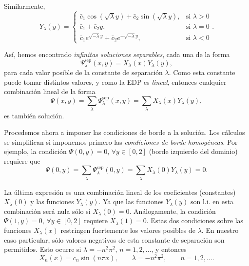 Similarmente,
\begin{equation}
    Y_\lambda(y)= 	\begin{cases}
        \bar{c}_1\cos(\sqrt{\lambda}y) + \bar{c}_2\sin(\sqrt{\lambda}y), & \text{si }\lambda>0  \\
        \bar{c}_1 + \bar{c}_2y,                                          & \text{si } \lambda=0 \\
        \bar{c}_1e^{\sqrt{-\lambda}y} + \bar{c}_2e^{-\sqrt{-\lambda}y},  & \text{si } \lambda<0
    \end{cases}.
\end{equation}

Así, hemos encontrado \textit{infinitas soluciones separables}, cada una de la forma
\begin{equation}\label{EjLapPsiXY}
    \Psi_\lambda^\text{sep}(x,y)=X_\lambda(x)Y_\lambda(y),
\end{equation}
para cada valor posible de la constante de separación $\lambda$. Como esta constante puede tomar distintos valores, y como la EDP es \textit{lineal}, entonces cualquier combinación lineal de la forma
\begin{equation}\label{EjLapPsisumaSep}
    \Psi(x,y) = \sum_{\lambda}\Psi_\lambda^\text{sep}(x,y) = \sum_{\lambda}X_\lambda(x)Y_\lambda(y),
\end{equation}
es también solución.

Procedemos ahora a imponer las condiciones de borde a la solución. Los cálculos se simplifican si imponemos primero las \textit{condiciones de borde homogéneas}. Por ejemplo, la condición $\Psi(0,y)=0$, $\forall y\in[0,2]$ (borde izquierdo del dominio) requiere que
\begin{equation}
    \Psi(0,y) = \sum_{\lambda}\Psi_\lambda^\text{sep}(0,y) = \sum_{\lambda}X_\lambda(0)Y_\lambda(y) = 0.
\end{equation}

La última expresión es una combinación lineal de los coeficientes (constantes) $X_\lambda(0)$ y las funciones $Y_\lambda(y)$. Ya que las funciones $Y_\lambda(y)$ son l.i. en esta combinación será nula sólo si $X_\lambda(0)=0$. Análogamente, la condición
$\Psi(1,y)=0$, $\forall y\in[0,2]$ requiere $X_\lambda(1)=0$. Estas dos condiciones sobre las funciones $X_\lambda(x)$ restringen fuertemente los valores posibles de $\lambda$. En nuestro caso particular, sólo valores negativos de esta constante de separación son permitidos. Esto ocurre si $\lambda = -n^2\pi^2$, $n=1,2,\dots$, y entonces
\begin{equation}
    X_n(x)=c_n\sin\left(n\pi x\right), \qquad \lambda = -n^2\pi^2, \qquad n=1,2,\dots.
\end{equation}

